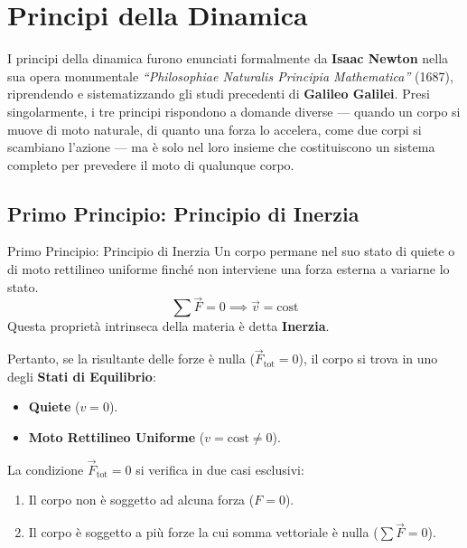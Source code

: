 \section{Principi della Dinamica}
I principi della dinamica furono enunciati formalmente da \textbf{Isaac Newton} nella sua opera monumentale \textit{``Philosophiae Naturalis Principia Mathematica''} (1687), riprendendo e sistematizzando gli studi precedenti di \textbf{Galileo Galilei}.
Presi singolarmente, i tre principi rispondono a domande diverse — quando un corpo si muove di moto naturale, di quanto una forza lo accelera, come due corpi si scambiano l'azione — ma è solo nel loro insieme che costituiscono un sistema completo per prevedere il moto di qualunque corpo.

\subsection{Primo Principio: Principio di Inerzia}
\begin{definizione}{Primo Principio: Principio di Inerzia}
Un corpo permane nel suo stato di quiete o di moto rettilineo uniforme finché non interviene una forza esterna a variarne lo stato.
\begin{equation}
    \sum \vec{F} = 0 \implies \vec{v} = \text{cost}
\end{equation}
Questa proprietà intrinseca della materia è detta \textbf{Inerzia}.
\end{definizione}

Pertanto, se la risultante delle forze è nulla ($\vec{F}_{\text{tot}} = 0$), il corpo si trova in uno degli \textbf{Stati di Equilibrio}:
\begin{itemize}
    \item \textbf{Quiete} ($v=0$).
    \item \textbf{Moto Rettilineo Uniforme} ($v = \text{cost} \neq 0$).
\end{itemize}

La condizione $\vec{F}_{\text{tot}} = 0$ si verifica in due casi esclusivi:
\begin{enumerate}[label=\alph*)]
    \item Il corpo non è soggetto ad alcuna forza ($F=0$).
    \item Il corpo è soggetto a più forze la cui somma vettoriale è nulla ($\sum \vec{F} = 0$).
\end{enumerate}


